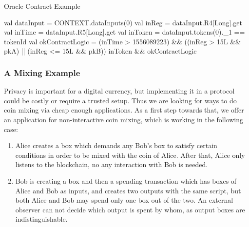  \begin{algorithm}[H]
    \caption{Oracle Contract Example}
    \label{alg:oracle}
    \begin{algorithmic}[1]
        \State val dataInput = CONTEXT.dataInputs(0)
        \State val inReg = dataInput.R4[Long].get
        \State val inTime = dataInput.R5[Long].get
        \State val inToken = dataInput.tokens(0).\_1 == tokenId
        \State val okContractLogic = (inTime > 1556089223) \&\& ((inReg > 15L \&\& pkA) || (inReg <= 15L \&\& pkB))
        \State inToken \&\& okContractLogic
    \end{algorithmic}
 \end{algorithm}


\subsubsection{A Mixing Example}
 \label{sec:platform}

 Privacy is important for a digital currency, but implementing it in a protocol could be costly or require a trusted
 setup. Thus we are looking for ways to do coin mixing via cheap enough applications. As a first step towards that, we
 offer an application for non-interactive coin mixing, which is working in the following case:
 \begin{enumerate}
    \item{} Alice creates a box which demands any Bob's box to satisfy certain conditions in order to be mixed with
    the coin of Alice. After that, Alice only listens to the blockchain, no any interaction with Bob is needed.
    \item{} Bob is creating a box and then a spending transaction which has boxes of Alice and Bob as inputs,
     and creates two outputs with the same script, but both Alice and Bob may spend only one box out of the two.
     An external observer can not decide which output is spent by whom, as output boxes are indistinguishable.
 \end{enumerate}

